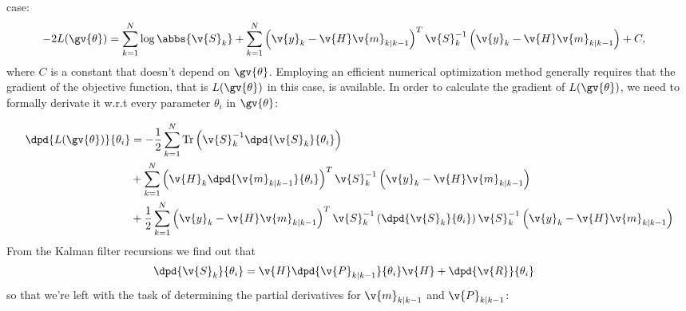 case:
\begin{align}
	-2L(\gv{\theta})&=\sum_{k=1}^N\log\abbs{\v{S}_k}
	+\sum_{k=1}^N\left(\v{y}_k-\v{H}\v{m}_{k|k-1}\right)^T\v{S}_{k}^{-1}\left(\v{y}_k-\v{H}\v{m}_{k|k-1}\right)+C,
	\label{eq:logLH}
\end{align}
where $C$ is a constant that doesn't depend on $\gv{\theta}$.
Employing an efficient numerical optimization method generally
requires that the gradient of the objective function, that is $L(\gv{\theta})$ in this case,
is available. In order to calculate the gradient of $L(\gv{\theta})$, we need to formally derivate
it w.r.t every parameter $\theta_i$ in $\gv{\theta}$:

\begin{align}
\begin{split}
	\dpd{L(\gv{\theta})}{\theta_i}
	&=-\frac{1}{2}\sum_{k=1}^N\mathrm{Tr}\left(\v{S}_{k}^{-1}\dpd{\v{S}_k}{\theta_i}\right)\\
	&+\sum_{k=1}^N\left(\v{H}_k\dpd{\v{m}_{k|k-1}}{\theta_i}\right)^T\v{S}_{k}^{-1}\left(\v{y}_k-\v{H}\v{m}_{k|k-1}\right)\\
	&+\frac{1}{2}\sum_{k=1}^N\left(\v{y}_k-\v{H}\v{m}_{k|k-1}\right)^T\v{S}_{k}^{-1}\left(\dpd{\v{S}_k}{\theta_i}\right)\v{S}_{k}^{-1}\left(\v{y}_k-\v{H}\v{m}_{k|k-1}\right)\\
	\label{eq:dlogLH}
\end{split}
\end{align}
From the Kalman filter recursions we find out that 
\begin{align}
	\dpd{\v{S}_k}{\theta_i}&=\v{H}\dpd{\v{P}_{k|k-1}}{\theta_i}\v{H}+\dpd{\v{R}}{\theta_i}
\end{align}
so that we're left with the task of determining the partial derivatives for
$\v{m}_{k|k-1}$ and $\v{P}_{k|k-1}$:


